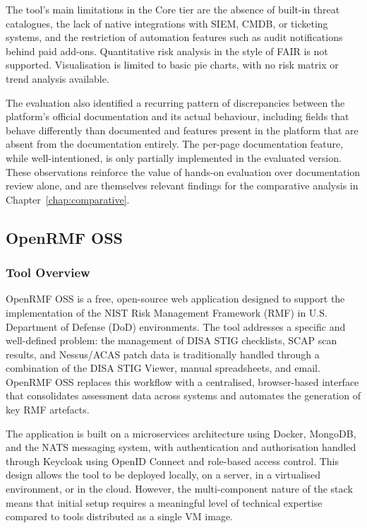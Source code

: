 The tool's main limitations in the Core tier are the absence of built-in threat
catalogues, the lack of native integrations with SIEM, CMDB, or ticketing systems, and
the restriction of automation features such as audit notifications behind paid add-ons.
Quantitative risk analysis in the style of FAIR is not supported. Visualisation is
limited to basic pie charts, with no risk matrix or trend analysis available.
 
The evaluation also identified a recurring pattern of discrepancies between the
platform's official documentation and its actual behaviour, including fields that behave
differently than documented and features present in the platform that are absent from
the documentation entirely. The per-page documentation feature, while well-intentioned,
is only partially implemented in the evaluated version. These observations reinforce the
value of hands-on evaluation over documentation review alone, and are themselves
relevant findings for the comparative analysis in Chapter~\ref{chap:comparative}.

\subsection{OpenRMF OSS} %
\subsubsection{Tool Overview}
 
OpenRMF OSS is a free, open-source web application designed to support the
implementation of the NIST Risk Management Framework (RMF) in U.S. Department of
Defense (DoD) environments. The tool addresses a specific and well-defined problem:
the management of DISA STIG checklists, SCAP scan results, and Nessus/ACAS patch
data is traditionally handled through a combination of the DISA STIG Viewer, manual
spreadsheets, and email. OpenRMF OSS replaces this workflow with a centralised,
browser-based interface that consolidates assessment data across systems and automates
the generation of key RMF artefacts.
 
The application is built on a microservices architecture using Docker, MongoDB, and
the NATS messaging system, with authentication and authorisation handled through
Keycloak using OpenID Connect and role-based access control. This design allows the
tool to be deployed locally, on a server, in a virtualised environment, or in the
cloud. However, the multi-component nature of the stack means that initial setup
requires a meaningful level of technical expertise compared to tools distributed
as a single VM image.
 
